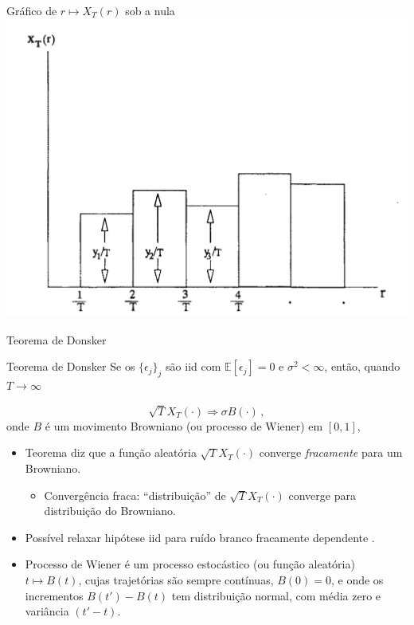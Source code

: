 \documentclass[11pt]{beamer}
\begin{document}
\begin{frame}{Gráfico de $r \mapsto X_T(r)$ sob a nula}
	\centering
	\includegraphics[scale=0.5]{graficos/escada.png}
\end{frame}

\begin{frame}{Teorema de Donsker}
	\begin{block}{Teorema de Donsker}
		Se os $\{\epsilon_j\}_{j}$ são iid com $\mathbb{E}[\epsilon_j]=0$ e $\sigma^2 < \infty$, então, quando $T \to \infty$
		
		$$\sqrt{T}X_T(\cdot) \Rightarrow \sigma B(\cdot)\, ,$$
		onde $B$ é um movimento Browniano (ou processo de Wiener) em $[0,1]$,
	\end{block}
	\begin{itemize}
		\item Teorema diz que a  função aleatória $\sqrt{T}X_T(\cdot)$ converge \emph{fracamente} para um Browniano.
		\begin{itemize}
			\item Convergência fraca: ``distribuição'' de $\sqrt{T}X_T(\cdot)$ converge para distribuição do Browniano.
		\end{itemize}
		\item Possível relaxar hipótese iid para ruído branco fracamente dependente \citep{Phillips1988}.
		\item Processo de Wiener é um processo estocástico (ou função aleatória) $t \mapsto B(t)$, cujas trajetórias são sempre contínuas, $B(0) = 0$, e onde os incrementos $B(t') - B(t)$ tem distribuição normal, com média zero e variância $(t'-t)$.
	\end{itemize}
\end{frame}
\end{document}
